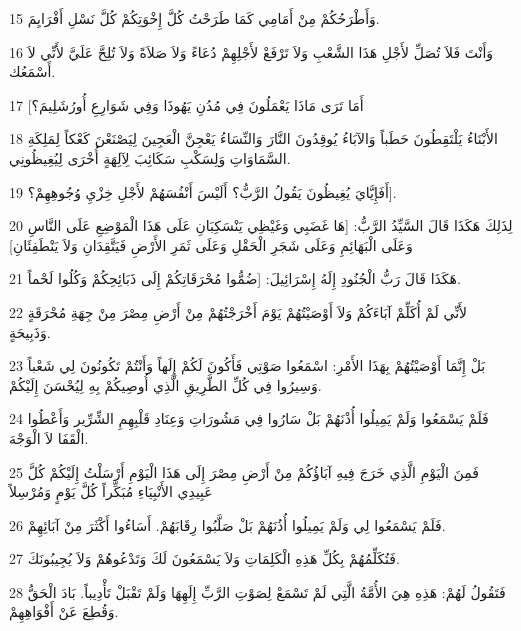 \par 15 وَأَطْرَحُكُمْ مِنْ أَمَامِي كَمَا طَرَحْتُ كُلَّ إِخْوَتِكُمْ كُلَّ نَسْلِ أَفْرَايِمَ.
\par 16 وَأَنْتَ فَلاَ تُصَلِّ لأَجْلِ هَذَا الشَّعْبِ وَلاَ تَرْفَعْ لأَجْلِهِمْ دُعَاءً وَلاَ صَلاَةً وَلاَ تُلِحَّ عَلَيَّ لأَنِّي لاَ أَسْمَعُك.
\par 17 [أَمَا تَرَى مَاذَا يَعْمَلُونَ فِي مُدُنِ يَهُوذَا وَفِي شَوَارِعِ أُورُشَلِيمَ؟
\par 18 الأَبْنَاءُ يَلْتَقِطُونَ حَطَباً وَالآبَاءُ يُوقِدُونَ النَّارَ وَالنِّسَاءُ يَعْجِنَّ الْعَجِينَ لِيَصْنَعْنَ كَعْكاً لِمَلِكَةِ السَّمَاوَاتِ وَلِسَكْبِ سَكَائِبَ لِآلِهَةٍ أُخْرَى لِيُغِيظُونِي.
\par 19 أَفَإِيَّايَ يُغِيظُونَ يَقُولُ الرَّبُّ؟ أَلَيْسَ أَنْفُسَهُمْ لأَجْلِ خِزْيِ وُجُوهِهِمْ؟].
\par 20 لِذَلِكَ هَكَذَا قَالَ السَّيِّدُ الرَّبُّ: [هَا غَضَبِي وَغَيْظِي يَنْسَكِبَانِ عَلَى هَذَا الْمَوْضِعِ عَلَى النَّاسِ وَعَلَى الْبَهَائِمِ وَعَلَى شَجَرِ الْحَقْلِ وَعَلَى ثَمَرِ الأَرْضِ فَيَتَّقِدَانِ وَلاَ يَنْطَفِئَانِ]
\par 21 هَكَذَا قَالَ رَبُّ الْجُنُودِ إِلَهُ إِسْرَائِيلَ: [ضُمُّوا مُحْرَقَاتِكُمْ إِلَى ذَبَائِحِكُمْ وَكُلُوا لَحْماً.
\par 22 لأَنِّي لَمْ أُكَلِّمْ آبَاءَكُمْ وَلاَ أَوْصَيْتُهُمْ يَوْمَ أَخْرَجْتُهُمْ مِنْ أَرْضِ مِصْرَ مِنْ جِهَةِ مُحْرَقَةٍ وَذَبِيحَةٍ.
\par 23 بَلْ إِنَّمَا أَوْصَيْتُهُمْ بِهَذَا الأَمْرِ: اسْمَعُوا صَوْتِي فَأَكُونَ لَكُمْ إِلَهاً وَأَنْتُمْ تَكُونُونَ لِي شَعْباً وَسِيرُوا فِي كُلِّ الطَّرِيقِ الَّذِي أُوصِيكُمْ بِهِ لِيُحْسَنَ إِلَيْكُمْ.
\par 24 فَلَمْ يَسْمَعُوا وَلَمْ يَمِيلُوا أُذْنَهُمْ بَلْ سَارُوا فِي مَشُورَاتِ وَعِنَادِ قَلْبِهِمِ الشِّرِّير وَأَعْطُوا الْقَفَا لاَ الْوَجْهَ.
\par 25 فَمِنَ الْيَوْمِ الَّذِي خَرَجَ فِيهِ آبَاؤُكُمْ مِنْ أَرْضِ مِصْرَ إِلَى هَذَا الْيَوْمِ أَرْسَلْتُ إِلَيْكُمْ كُلَّ عَبِيدِي الأَنْبِيَاءِ مُبَكِّراً كُلَّ يَوْمٍ وَمُرْسِلاً
\par 26 فَلَمْ يَسْمَعُوا لِي وَلَمْ يَمِيلُوا أُذُنَهُمْ بَلْ صَلَّبُوا رِقَابَهُمْ. أَسَاءُوا أَكْثَرَ مِنْ آبَائِهِمْ.
\par 27 فَتُكَلِّمُهُمْ بِكُلِّ هَذِهِ الْكَلِمَاتِ وَلاَ يَسْمَعُونَ لَكَ وَتَدْعُوهُمْ وَلاَ يُجِيبُونَكَ.
\par 28 فَتَقُولُ لَهُمْ: هَذِهِ هِيَ الأُمَّةُ الَّتِي لَمْ تَسْمَعْ لِصَوْتِ الرَّبِّ إِلَهِهَا وَلَمْ تَقْبَلْ تَأْدِيباً. بَادَ الْحَقُّ وَقُطِعَ عَنْ أَفْوَاهِهِمْ.
